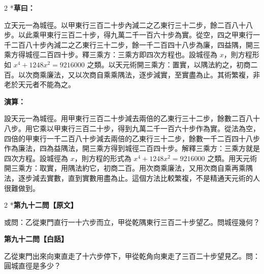 \documentclass[11pt,a4paper]{article}
\begin{document}
\begin{paracol}{2}
\switchcolumn[0]*\textbf{草曰：}

\small 立天元一為城徑。以甲東行三百二十步內減二之乙東行三十二步，餘二百八十八步。以此乘甲東行三百二十步，得九萬二千一百六十步為實。從空，四之甲東行一千二百八十步內減二之乙東行三十二步，餘一千二百四十八步為廉，四益隅，開三乘方得城徑二百四十步。釋三乘方：三乘方即四次方程也。設城徑為 $x$，則方程形如 $x^4 + 1248x^2 = 9216000$ 之類。以天元術開三乘方：置實，以隅法約之，初商二百。以次商乘廉法，又以次商自乘乘隅法，逐步減實，至實盡為止。其術繁複，非老於天元者不能為之。

\switchcolumn\textbf{演算：}

\small 設天元一為城徑。用甲東行三百二十步減去兩倍的乙東行三十二步，餘數二百八十八步。用它乘以甲東行三百二十步，得到九萬二千一百六十步作為實。從法為空，四倍的甲東行一千二百八十步減去兩倍的乙東行三十二步，餘數一千二百四十八步作為廉法，四為益隅法，開三乘方得到城徑二百四十步。解釋三乘方：三乘方就是四次方程。設城徑為 $x$，則方程的形式為 $x^4 + 1248x^2 = 9216000$ 之類。用天元術開三乘方：取實，用隅法約它，初商二百。用次商乘廉法，又用次商自乘再乘隅法，逐步減去實數，直到實數用盡為止。這個方法比較繁複，不是精通天元術的人很難做到。
\end{paracol}

\vspace{0.1cm}
\noindent{}
\par\vspace{0.3cm}

\begin{paracol}{2}
\switchcolumn[0]*\noindent\textbf{第九十二問【原文】}

\small 或問：乙從東門直行一十六步而立，甲從乾隅東行三百二十步望乙。問城徑幾何？

\switchcolumn\noindent\textbf{第九十二問【白話】}

\small 乙從東門出來向東直走了十六步停下，甲從乾角向東走了三百二十步望見乙。問：圓城直徑是多少？
\end{paracol}

\vspace{0.1cm}
\noindent{}
\par\vspace{0.15cm}
\end{document}
